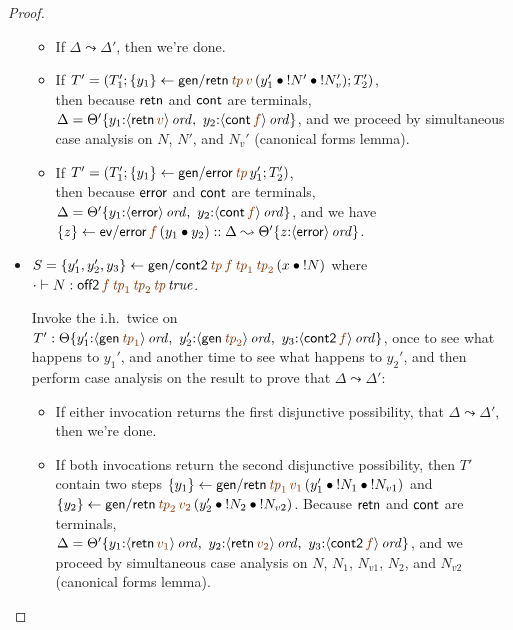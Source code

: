 \begin{proof}
\begin{itemize}
\begin{itemize}
\item If $\Delta \leadsto \Delta'$, then we're done. 
\item If $T' = \left(T_1'; \trstep{y_1}{{\sf gen/retn}\,\lf{{\it tp}}\,\lf{v}\,(\tfuser{y_1'}{\tfuser{\tbangr{N'}}{\tbangr{N_v'}}})}; T_2'\right)$,
\\
then because ${\sf retn}$ and ${\sf cont}$ are 
terminals, $\Delta = \tackon{\Theta'}{
         y_1{:}\istrue{\susp{{\sf retn}\,\lf{v}}}, ~
         y_2{:}\istrue{\susp{{\sf cont}\,\lf{f}}}}$, and we 
proceed by
simultaneous case analysis on $N$, $N'$, and $N_v'$ (canonical forms lemma). 
\item If $T' = \left(T_1'; \trstep{y_1}{{\sf gen/error}\,\lf{{\it tp}}\,y_1'}; T_2'\right)$,
\\
then because ${\sf error}$ and ${\sf cont}$ are terminals,
$\Delta = \tackon{\Theta'}{
         y_1{:}\istrue{\susp{{\sf error}}}, ~
         y_2{:}\istrue{\susp{{\sf cont}\,\lf{f}}}}$, and we have
$\trstep{z}{{\sf ev/error}\,\lf{f}\,(\tfuser{y_1}{y_2})} :: \Delta \leadsto \tackon{\Theta'}{z{:}\istrue{\susp{{\sf error}}}}$.

\end{itemize}

\medskip
\item $S = \trstep{y_1', y_2', y_3}{{\sf gen/cont2}\,\lf{{\it tp}}\,\lf{f}\,\lf{{\it tp}_1}\,\lf{{\it tp}_2}\,(\tfuser{x}{\tbangr{N}})}$
where $\cdot \vdash N : \isconc{{\sf off2}\,\lf{f}\,\lf{{\it tp}_1}\, \lf{{\it tp}_2}\,\lf{{\it tp}}}$.


Invoke the i.h.~twice on $T' :
\tackon{\Theta}{y_1'{:}\istrue{\susp{{\sf gen}\,\lf{{\it tp}_1}}}, ~
  y_2'{:}\istrue{\susp{{\sf gen}\,\lf{{\it tp}_2}}}, ~
  y_3{:}\istrue{\susp{{\sf cont2}\,\lf{f}}}}$, once to see what happens
to $y_1'$, and another time to see what happens to $y_2'$,
and then perform case analysis on the result to prove that
$\Delta \leadsto \Delta'$:

\begin{itemize}
\item If either invocation returns the first disjunctive possibility,
  that $\Delta \leadsto \Delta'$, then we're done.

\item
If both invocations return the second disjunctive possibility, then
 $T'$ contain two steps
$\trstep{y_1}{{\sf gen/retn}\,\lf{{\it tp}_1}\,\lf{v_1}\,(\tfuser{y_1'}{\tfuser{\tbangr{N_1}}{\tbangr{N_{v1}}}})}$ and \\
$\trstep{y_2}{{\sf gen/retn}\,\lf{{\it tp}_2}\,\lf{v_2}\,(\tfuser{y_2'}{\tfuser{\tbangr{N_2}}{\tbangr{N_{v2}}}})}$. Because ${\sf retn}$ and ${\sf cont}$
are terminals, \\$\Delta = \tackon{\Theta'}{y_1{:}\istrue{\susp{{\sf retn}\,\lf{v_1}}}, ~ y_2{:}\istrue{\susp{{\sf retn}\,\lf{v_2}}}, ~ y_3{:}\istrue{\susp{{\sf cont2}\,\lf{f}}}}$, and we proceed
by simultaneous case analysis on $N$, $N_1$, $N_{v1}$, $N_2$, and $N_{v2}$
(canonical forms lemma). 


\end{itemize}
\end{itemize}
\end{proof}
